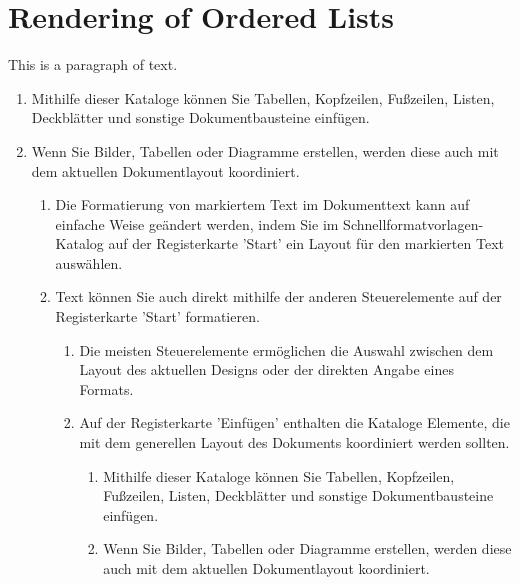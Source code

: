 \documentclass[11pt,a4paper]{article}
\begin{document}
\section{\XeTeX{} Rendering of Ordered Lists}
This is a paragraph of text.
\begin{enumerate}
	\item Mithilfe dieser Kataloge können Sie Tabellen, Kopfzeilen, Fußzeilen, Listen, Deckblätter und sonstige Dokumentbausteine einfügen.
	\item Wenn Sie Bilder, Tabellen oder Diagramme erstellen, werden diese auch mit dem aktuellen Dokumentlayout koordiniert.
	\begin{enumerate}
		\item Die Formatierung von markiertem Text im Dokumenttext kann auf einfache Weise geändert werden, indem Sie im Schnellformatvorlagen-Katalog auf der Registerkarte 'Start' ein Layout für den markierten Text auswählen.
		\item Text können Sie auch direkt mithilfe der anderen Steuerelemente auf der Registerkarte 'Start' formatieren.
		\begin{enumerate}
			\item Die meisten Steuerelemente ermöglichen die Auswahl zwischen dem Layout des aktuellen Designs oder der direkten Angabe eines Formats.
			\item Auf der Registerkarte 'Einfügen' enthalten die Kataloge Elemente, die mit dem generellen Layout des Dokuments koordiniert werden sollten.
			\begin{enumerate}
				\item Mithilfe dieser Kataloge können Sie Tabellen, Kopfzeilen, Fußzeilen, Listen, Deckblätter und sonstige Dokumentbausteine einfügen.
				\item Wenn Sie Bilder, Tabellen oder Diagramme erstellen, werden diese auch mit dem aktuellen Dokumentlayout koordiniert.
			\end{enumerate}
		\end{enumerate}
	\end{enumerate}
\end{enumerate}
\end{document}
